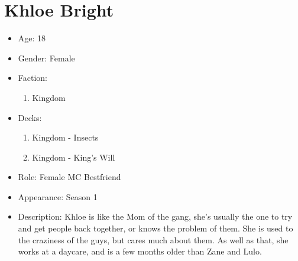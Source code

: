\section{Khloe Bright}
\begin{itemize}
	\item Age: 18
	\item Gender: Female
	\item Faction:
	      \begin{enumerate}
		      \item Kingdom
	      \end{enumerate}
	\item Decks:
	      \begin{enumerate}
		      \item Kingdom - Insects
		      \item Kingdom - King's Will
	      \end{enumerate}
	\item Role: Female MC Bestfriend
	\item Appearance: Season 1
	\item Description: Khloe is like the Mom of the gang, she's usually the
	      one to try and get people back together, or knows the problem of them. She
	      is used to the craziness of the guys, but cares much about them. As well as that,
	      she works at a daycare, and is a few months older than Zane and Lulo.
\end{itemize}
\newpage